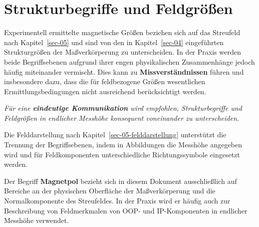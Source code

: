 \documentclass[
  ngerman,
  a4paper,
  twoside]{scrbook}
\newcounter{quartocallouttipno}
\newcommand{\quartocallouttip}[1]{\refstepcounter{quartocallouttipno}\label{#1}}
\begin{document}
\section{Strukturbegriffe und
Feldgrößen}\label{sec-06-strukturbegriffe-feldgroessen}

Experimentell ermittelte magnetische Größen beziehen sich auf das
Streufeld nach Kapitel~\ref{sec-05} und sind von den in
Kapitel~\ref{sec-04} eingeführten Strukturgrößen der Maßverkörperung zu
unterscheiden. In der Praxis werden beide Begriffsebenen aufgrund ihrer
engen physikalischen Zusammenhänge jedoch häufig miteinander vermischt.
Dies kann zu \textbf{Missverständnissen} führen und insbesondere dazu,
dass die für feldbezogene Größen wesentlichen Ermittlungsbedingungen
nicht ausreichend berücksichtigt werden.

\begin{tcolorbox}[enhanced jigsaw, arc=.35mm, bottomrule=.15mm, bottomtitle=1mm, breakable, colback=white, colbacktitle=quarto-callout-tip-color!10!white, colframe=quarto-callout-tip-color-frame, coltitle=black, left=2mm, leftrule=.75mm, opacityback=0, opacitybacktitle=0.6, rightrule=.15mm, title=\textcolor{quarto-callout-tip-color}{\faLightbulb}\hspace{0.5em}{Hinweis \ref*{tip-06-struktur-feld-trennung}}, titlerule=0mm, toprule=.15mm, toptitle=1mm]

\quartocallouttip{tip-06-struktur-feld-trennung} 

\emph{Für eine \textbf{eindeutige Kommunikation} wird empfohlen,
Strukturbegriffe und Feldgrößen in endlicher Messhöhe konsequent
voneinander zu unterscheiden.}

\end{tcolorbox}

Die Felddarstellung nach Kapitel~\ref{sec-05-felddarstellung}
unterstützt die Trennung der Begriffsebenen, indem in Abbildungen die
Messhöhe angegeben wird und für Feldkomponenten unterschiedliche
Richtungssymbole eingesetzt werden.

Der Begriff \textbf{Magnetpol} bezieht sich in diesem Dokument
ausschließlich auf Bereiche an der physischen Oberfläche der
Maßverkörperung und die Normalkomponente des Streufeldes. In der Praxis
wird er häufig auch zur Beschreibung von Feldmerkmalen von OOP- und
IP-Komponenten in endlicher Messhöhe verwendet.
\end{document}
